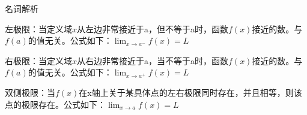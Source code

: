 \documentclass[UTF8,fontset=ubuntu]{ctexart}
\begin{document}
名词解析\par
左极限：当定义域$x$从左边非常接近于a，但不等于a时，函数$f(x)$接近的数。与$f(a)$的值无关。公式如下：$\lim_{x\to a^-}f(x)=L$

右极限：当定义域$x$从右边非常接近于a，当不等于a时，函数$f(x)$接近的数。与$f(a)$的值无关。公式如下：$\lim_{x\to a^+}f(x)=L$

双侧极限：当$f(x)$在x轴上关于某具体点的左右极限同时存在，并且相等，则该点的极限存在。公式如下：$\lim_{x\to a}f(x)=L$
\end{document}
